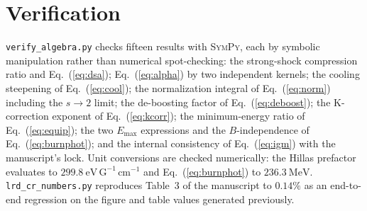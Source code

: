 \documentclass[11pt,a4paper]{article}
\begin{document}
\section{Verification}
\label{sec:ver}
\texttt{verify\_algebra.py} checks fifteen results with \textsc{SymPy}, each
by symbolic manipulation rather than numerical spot-checking: the strong-shock
compression ratio and Eq.~(\ref{eq:dsa}); Eq.~(\ref{eq:alpha}) by two
independent kernels; the cooling steepening of Eq.~(\ref{eq:cool}); the
normalization integral of Eq.~(\ref{eq:norm}) including the $s\to2$ limit; the
de-boosting factor of Eq.~(\ref{eq:deboost}); the K-correction exponent of
Eq.~(\ref{eq:kcorr}); the minimum-energy ratio of Eq.~(\ref{eq:equip}); the two
$E_{\max}$ expressions and the $B$-independence of Eq.~(\ref{eq:burnphot}); and
the internal consistency of Eq.~(\ref{eq:igm}) with the manuscript's lock. Unit
conversions are checked numerically: the Hillas prefactor evaluates to
$299.8\ \mathrm{eV\,G^{-1}\,cm^{-1}}$ and Eq.~(\ref{eq:burnphot}) to
$236.3\ \mathrm{MeV}$. \texttt{lrd\_cr\_numbers.py} reproduces Table~3 of the
manuscript to $0.14\%$ as an end-to-end regression on the figure and table
values generated previously.

\end{document}
